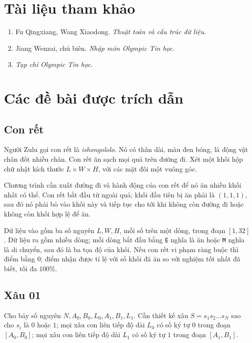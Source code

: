 \documentclass[11pt]{article}
\begin{document}
\section*{Tài liệu tham khảo}

\begin{enumerate}
  \item Fu Qingxiang, Wang Xiaodong. \emph{Thuật toán và cấu trúc dữ liệu}.
  \item Jiang Wenzai, chủ biên. \emph{Nhập môn Olympic Tin học}.
  \item \emph{Tạp chí Olympic Tin học}.
\end{enumerate}

\appendix

\section{Các đề bài được trích dẫn}

\subsection{Con rết}

Người Zulu gọi con rết là \emph{ishongololo}. Nó có thân dài, màu đen bóng,
là động vật chân đốt nhiều chân. Con rết ăn sạch mọi quả trên đường đi. Xét
một khối hộp chữ nhật kích thước $L\times W\times H$, với các mặt đôi một
vuông góc.

Chương trình cần xuất đường đi và hành động của con rết để nó ăn nhiều khối
nhất có thể. Con rết bắt đầu từ ngoài quả; khối đầu tiên bị ăn phải là
$(1,1,1)$, sau đó nó phải bò vào khối này và tiếp tục cho tới khi không còn
đường đi hoặc không còn khối hợp lệ để ăn.

Dữ liệu vào gồm ba số nguyên $L,W,H$, mỗi số trên một dòng, trong đoạn
$[1,32]$. Dữ liệu ra gồm nhiều dòng; mỗi dòng bắt đầu bằng \texttt{E} nghĩa
là ăn hoặc \texttt{M} nghĩa là di chuyển, sau đó là ba tọa độ của khối. Nếu
con rết vi phạm ràng buộc thì điểm bằng $0$; điểm nhận được tỉ lệ với số
khối đã ăn so với nghiệm tốt nhất đã biết, tối đa $100\%$.

\subsection{Xâu 01}

Cho bảy số nguyên $N,A_0,B_0,L_0,A_1,B_1,L_1$. Cần thiết kế xâu
$S=s_1s_2\ldots s_N$ sao cho $s_i$ là $0$ hoặc $1$; mọi xâu con liên tiếp
độ dài $L_0$ có số ký tự $0$ trong đoạn $[A_0,B_0]$; mọi xâu con liên tiếp
độ dài $L_1$ có số ký tự $1$ trong đoạn $[A_1,B_1]$.
\end{document}

